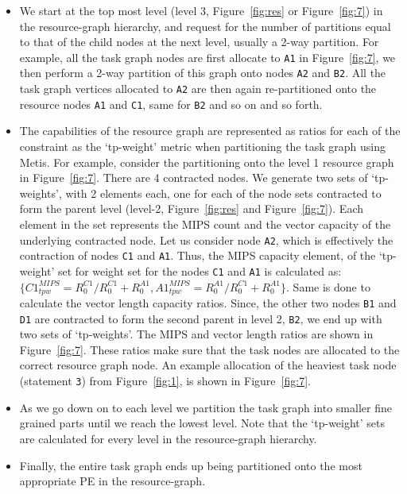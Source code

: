 \begin{itemize}

\item We start at the top most level (level 3, Figure~\ref{fig:res} or
  Figure~\ref{fig:7}) in the resource-graph hierarchy, and request for
  the number of partitions equal to that of the child nodes at the next
  level, usually a 2-way partition. For example, all the task graph
  nodes are first allocate to \texttt{A1} in Figure~\ref{fig:7}, we then
  perform a 2-way partition of this graph onto nodes \texttt{A2} and
  \texttt{B2}. All the task graph vertices allocated to \texttt{A2} are
  then again re-partitioned onto the resource nodes \texttt{A1} and
  \texttt{C1}, same for \texttt{B2} and so on and so forth.

\item The capabilities of the resource graph are represented as ratios
  for each of the constraint as the `tp-weight' metric when partitioning
  the task graph using Metis. For example, consider the partitioning
  onto the level 1 resource graph in Figure~\ref{fig:7}. There are 4
  contracted nodes. We generate two sets of `tp-weights', with 2
  elements each, one for each of the node sets contracted to form the
  parent level (level-2, Figure~\ref{fig:res} and
  Figure~\ref{fig:7}). Each element in the set represents the MIPS count
  and the vector capacity of the underlying contracted node. Let us
  consider node \texttt{A2}, which is effectively the contraction of
  nodes \texttt{C1} and \texttt{A1}. Thus, the MIPS capacity element, of
  the `tp-weight' set for weight set for the nodes \texttt{C1} and
  \texttt{A1} is calculated as: {$\{C1^{MIPS}_{tpw} = R^{C1}_0/R^{C1}_0
    + R^{A1}_0, A1^{MIPS}_{tpw} = R^{A1}_0/R^{C1}_0 + R^{A1}_0\}$}. Same
  is done to calculate the vector length capacity ratios. Since, the
  other two nodes \texttt{B1} and \texttt{D1} are contracted to form the
  second parent in level 2, \texttt{B2}, we end up with two sets of
  `tp-weights'. The MIPS and vector length ratios are shown in
  Figure~\ref{fig:7}. These ratios make sure that the task nodes are
  allocated to the correct resource graph node. An example allocation of
  the heaviest task node (statement \texttt{3}) from Figure~\ref{fig:1},
  is shown in Figure~\ref{fig:7}.

\item As we go down on to each level we partition the task graph into
  smaller fine grained parts until we reach the lowest level. Note that
  the `tp-weight' sets are calculated for every level in the
  resource-graph hierarchy.

\item Finally, the entire task graph ends up being partitioned onto the
  most appropriate PE in the resource-graph.

\end{itemize}


